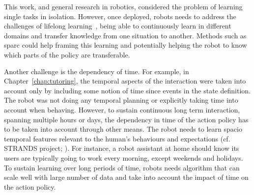 
This work, and general research in robotics, considered the problem of learning single tasks in isolation. However, once deployed, robots needs to address the challenges of lifelong learning~\citep{thrun1995lifelong}, being able to continuously learn in different domains and transfer knowledge from one situation to another. Methods such as \gls{sparc} could help framing this learning and potentially helping the robot to know which parts of the policy are transferable.

Another challenge is the dependency of time. For example, in Chapter~\ref{chap:tutoring}, the temporal aspects of the interaction were taken into account only by including some notion of time since events in the state definition. The robot was not doing any temporal planning or explicitly taking time into account when behaving. However, to sustain continuous long term interaction, spanning multiple hours or days, the dependency in time of the action policy has to be taken into account through other means. The robot needs to learn spacio temporal features relevant to the human's behaviours and expectations (cf. STRANDS project; \citealt{hawes2017strands}). For instance, a robot assistant at home should know its users are typically going to work every morning, except weekends and holidays. To sustain learning over long periods of time, robots needs algorithm that can scale well with large number of data and take into account the impact of time on the action policy.

